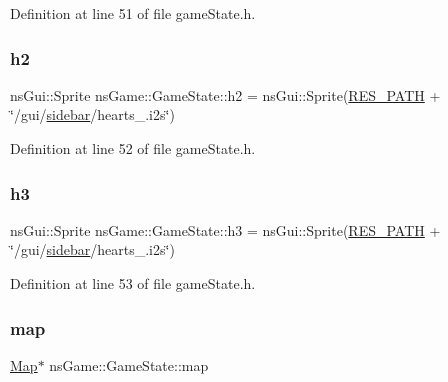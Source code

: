 Definition at line 51 of file game\+State.\+h.

\mbox{\label{classns_game_1_1_game_state_a1fbc7862058993d3ff53db6f50d3949d}} 
\subsubsection{\texorpdfstring{h2}{h2}}
{\footnotesize\ttfamily ns\+Gui\+::\+Sprite ns\+Game\+::\+Game\+State\+::h2 = ns\+Gui\+::\+Sprite(\hyperlink{definitions_8h_a793644bd88146828177a2a4f57e3bf01}{R\+E\+S\+\_\+\+P\+A\+TH} + \char`\"{}/gui/\hyperlink{classns_game_1_1_game_state_a144f7f71a2a43f8422a346e4bc9bb923}{sidebar}/hearts\+\_.\+i2s\char`\"{})}



Definition at line 52 of file game\+State.\+h.

\mbox{\label{classns_game_1_1_game_state_a421981b496870032de67b556f80ed1c9}} 
\subsubsection{\texorpdfstring{h3}{h3}}
{\footnotesize\ttfamily ns\+Gui\+::\+Sprite ns\+Game\+::\+Game\+State\+::h3 = ns\+Gui\+::\+Sprite(\hyperlink{definitions_8h_a793644bd88146828177a2a4f57e3bf01}{R\+E\+S\+\_\+\+P\+A\+TH} + \char`\"{}/gui/\hyperlink{classns_game_1_1_game_state_a144f7f71a2a43f8422a346e4bc9bb923}{sidebar}/hearts\+\_.\+i2s\char`\"{})}



Definition at line 53 of file game\+State.\+h.

\mbox{\label{classns_game_1_1_game_state_a451982a5efe66e5402402ed0f996fca6}} 
\subsubsection{\texorpdfstring{map}{map}}
{\footnotesize\ttfamily \hyperlink{classns_game_1_1_map}{Map}$\ast$ ns\+Game\+::\+Game\+State\+::map}



